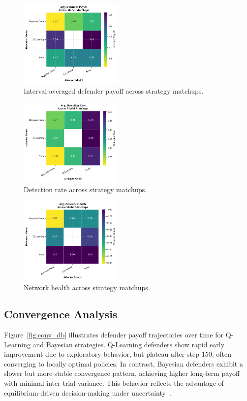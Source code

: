 \documentclass[conference]{IEEEtran}
\begin{document}
\begin{figure}[htbp]
  \centering
  \includegraphics[width=0.45\textwidth]{fig_def_payoff_heatmap.pdf}
  \caption{Interval-averaged defender payoff across strategy matchups.}
  \label{fig:def_payoff_heatmap}
\end{figure}

\begin{figure}[htbp]
  \centering
  \includegraphics[width=0.45\textwidth]{fig_detection_heatmap.pdf}
  \caption{Detection rate across strategy matchups.}
  \label{fig:detection_heatmap}
\end{figure}

\begin{figure}[htbp]
  \centering
  \includegraphics[width=0.45\textwidth]{fig_net_health_heatmap.pdf}
  \caption{Network health across strategy matchups.}
  \label{fig:health_heatmap}
\end{figure}

\subsection{Convergence Analysis}
Figure~\ref{fig:conv_db} illustrates defender payoff trajectories over time for Q-Learning and Bayesian strategies. Q-Learning defenders show rapid early improvement due to exploratory behavior, but plateau after step 150, often converging to locally optimal policies. In contrast, Bayesian defenders exhibit a slower but more stable convergence pattern, achieving higher long-term payoff with minimal inter-trial variance. This behavior reflects the advantage of equilibrium-driven decision-making under uncertainty~\cite{zeng2023comparison}.
\end{document}
